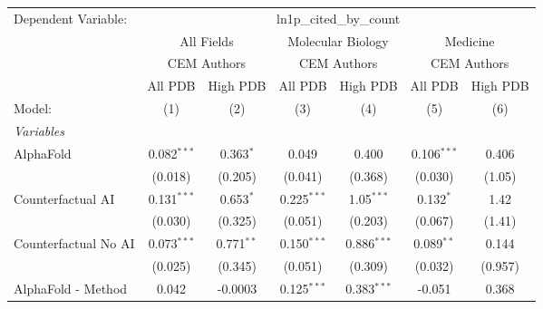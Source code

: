 \begingroup
\centering
\begin{tabular}{lcccccc}
   \tabularnewline \midrule \midrule
   Dependent Variable: & \multicolumn{6}{c}{ln1p\_cited\_by\_count}\\
 & \multicolumn{2}{c}{All Fields} & \multicolumn{2}{c}{Molecular Biology} & \multicolumn{2}{c}{Medicine} \\
\cmidrule(lr){2-3} \cmidrule(lr){4-5} \cmidrule(lr){6-7}
 & \multicolumn{2}{c}{CEM Authors} & \multicolumn{2}{c}{CEM Authors} & \multicolumn{2}{c}{CEM Authors} \\
\cmidrule(lr){2-3} \cmidrule(lr){4-5} \cmidrule(lr){6-7}
 & \multicolumn{1}{c}{All PDB} & \multicolumn{1}{c}{High PDB} & \multicolumn{1}{c}{All PDB} & \multicolumn{1}{c}{High PDB} & \multicolumn{1}{c}{All PDB} & \multicolumn{1}{c}{High PDB} \\
\cmidrule(lr){2-2} \cmidrule(lr){3-3} \cmidrule(lr){4-4} \cmidrule(lr){5-5} \cmidrule(lr){6-6} \cmidrule(lr){7-7}
   Model:                                                     & (1)           & (2)           & (3)           & (4)           & (5)           & (6)\\  
   \midrule
   \emph{Variables}\\
   AlphaFold                                                  & 0.082$^{***}$ & 0.363$^{*}$   & 0.049         & 0.400         & 0.106$^{***}$ & 0.406\\   
                                                              & (0.018)       & (0.205)       & (0.041)       & (0.368)       & (0.030)       & (1.05)\\   
   Counterfactual AI                                          & 0.131$^{***}$ & 0.653$^{*}$   & 0.225$^{***}$ & 1.05$^{***}$  & 0.132$^{*}$   & 1.42\\   
                                                              & (0.030)       & (0.325)       & (0.051)       & (0.203)       & (0.067)       & (1.41)\\   
   Counterfactual No AI                                       & 0.073$^{***}$ & 0.771$^{**}$  & 0.150$^{***}$ & 0.886$^{***}$ & 0.089$^{**}$  & 0.144\\   
                                                              & (0.025)       & (0.345)       & (0.051)       & (0.309)       & (0.032)       & (0.957)\\   
   AlphaFold - Method                                         & 0.042         & -0.0003       & 0.125$^{***}$ & 0.383$^{***}$ & -0.051        & 0.368\\   

\end{tabular}
